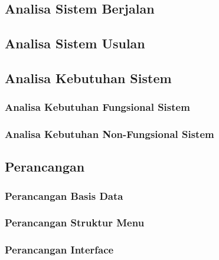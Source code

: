 %
%
%
%


\chapter{\babEmpat}
\section{Analisa Sistem Berjalan}
\section{Analisa Sistem Usulan}
\section{Analisa Kebutuhan Sistem}
\subsection{Analisa Kebutuhan Fungsional Sistem}
\subsection{Analisa Kebutuhan Non-Fungsional Sistem}
\section{Perancangan}
\subsection{Perancangan Basis Data}
\subsection{Perancangan Struktur Menu}
\subsection{Perancangan Interface}

